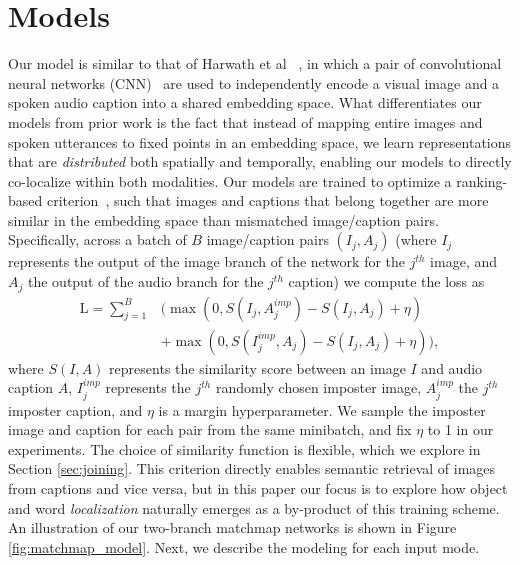 \section{Models}
Our model is similar to that of Harwath et al ~\cite{harwath_nips}, in which a pair of convolutional neural networks (CNN)~\cite{mnist} are used to independently encode a visual image and a spoken audio caption into a shared embedding space. What differentiates our models from prior work is the fact that instead of mapping entire images and spoken utterances to fixed points in an embedding space, we learn representations that are \textit{distributed} both spatially and temporally, enabling our models to directly co-localize within both modalities. Our models are trained to optimize a ranking-based criterion~\cite{bromley_1994,karpathy_2014,harwath_nips}, such that images and captions that belong together are more similar in the embedding space than mismatched image/caption pairs. Specifically, across a batch of $B$ image/caption pairs $(I_j, A_j)$ (where $I_j$ represents the output of the image branch of the network for the $j^{th}$ image, and $A_j$ the output of the audio branch for the $j^{th}$ caption) we compute the loss as
\begin{equation}
\begin{split}
\text{L} = \sum_{j=1}^B & \Big(\max(0, S(I_j, A_j^{imp}) - S(I_j, A_j) + \eta) \\ &+ \max(0, S(I_j^{imp}, A_j) - S(I_j, A_j) + \eta) \Big),
\label{eq:sampled_margin_ranking_objective}
\end{split}
\end{equation}
where $S(I, A)$ represents the similarity score between an image $I$ and audio caption $A$, $I_j^{imp}$ represents the $j^{th}$ randomly chosen imposter image, $A_j^{imp}$ the $j^{th}$ imposter caption, and $\eta$ is a margin hyperparameter. We sample the imposter image and caption for each pair from the same minibatch, and fix $\eta$ to 1 in our experiments. The choice of similarity function is flexible, which we explore in Section \ref{sec:joining}. This criterion directly enables semantic retrieval of images from captions and vice versa, but in this paper our focus is to explore how object and word \textit{localization} naturally emerges as a by-product of this training scheme. An illustration of our two-branch matchmap networks is shown in Figure \ref{fig:matchmap_model}. 
Next, we describe the modeling for each input mode.

